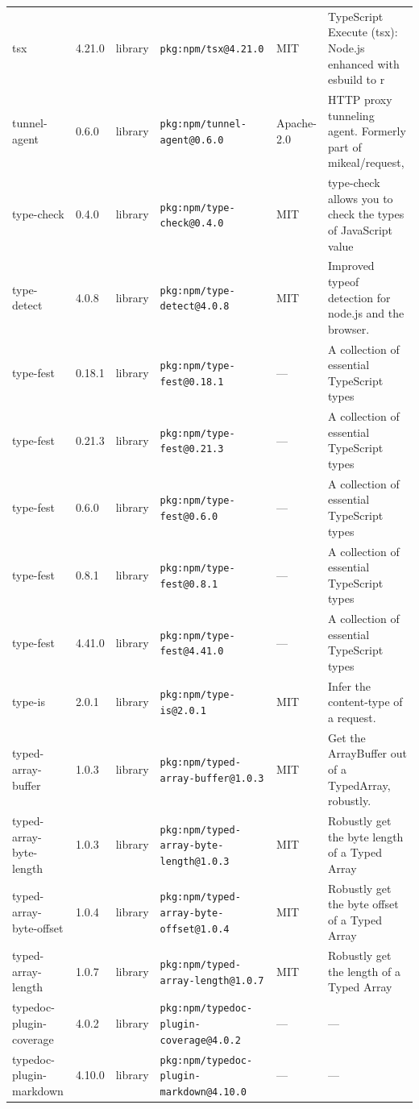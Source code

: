 \documentclass[11pt]{article}
\begin{document}
\begin{longtable}{|l|l|l|p{2.2cm}|l|p{4cm}|}
tsx & 4.21.0 & library & \texttt{pkg:npm/tsx@4.21.0} & MIT & TypeScript Execute (tsx): Node.js enhanced with esbuild to r \\
tunnel-agent & 0.6.0 & library & \texttt{pkg:npm/tunnel-agent@0.6.0} & Apache-2.0 & HTTP proxy tunneling agent. Formerly part of mikeal/request, \\
type-check & 0.4.0 & library & \texttt{pkg:npm/type-check@0.4.0} & MIT & type-check allows you to check the types of JavaScript value \\
type-detect & 4.0.8 & library & \texttt{pkg:npm/type-detect@4.0.8} & MIT & Improved typeof detection for node.js and the browser. \\
type-fest & 0.18.1 & library & \texttt{pkg:npm/type-fest@0.18.1} & — & A collection of essential TypeScript types \\
type-fest & 0.21.3 & library & \texttt{pkg:npm/type-fest@0.21.3} & — & A collection of essential TypeScript types \\
type-fest & 0.6.0 & library & \texttt{pkg:npm/type-fest@0.6.0} & — & A collection of essential TypeScript types \\
type-fest & 0.8.1 & library & \texttt{pkg:npm/type-fest@0.8.1} & — & A collection of essential TypeScript types \\
type-fest & 4.41.0 & library & \texttt{pkg:npm/type-fest@4.41.0} & — & A collection of essential TypeScript types \\
type-is & 2.0.1 & library & \texttt{pkg:npm/type-is@2.0.1} & MIT & Infer the content-type of a request. \\
typed-array-buffer & 1.0.3 & library & \texttt{pkg:npm/typed-array-buffer@1.0.3} & MIT & Get the ArrayBuffer out of a TypedArray, robustly. \\
typed-array-byte-length & 1.0.3 & library & \texttt{pkg:npm/typed-array-byte-length@1.0.3} & MIT & Robustly get the byte length of a Typed Array \\
typed-array-byte-offset & 1.0.4 & library & \texttt{pkg:npm/typed-array-byte-offset@1.0.4} & MIT & Robustly get the byte offset of a Typed Array \\
typed-array-length & 1.0.7 & library & \texttt{pkg:npm/typed-array-length@1.0.7} & MIT & Robustly get the length of a Typed Array \\
typedoc-plugin-coverage & 4.0.2 & library & \texttt{pkg:npm/typedoc-plugin-coverage@4.0.2} & — & — \\
typedoc-plugin-markdown & 4.10.0 & library & \texttt{pkg:npm/typedoc-plugin-markdown@4.10.0} & — & — \\

\end{longtable}
\end{document}
